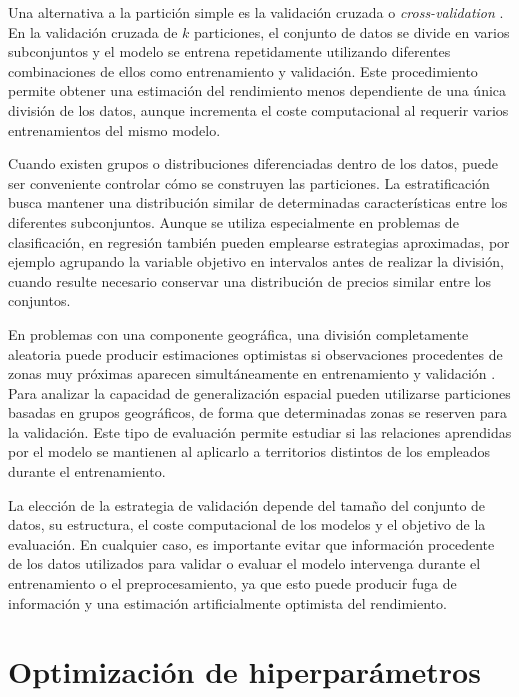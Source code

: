\documentclass[IB]{TFUOC}%
\begin{document}
Una alternativa a la partición simple es la validación cruzada o \textit{cross-validation} \cite{arlot2010crossvalidation}. En la validación cruzada de $k$ particiones, el conjunto de datos se divide en varios subconjuntos y el modelo se entrena repetidamente utilizando diferentes combinaciones de ellos como entrenamiento y validación. Este procedimiento permite obtener una estimación del rendimiento menos dependiente de una única división de los datos, aunque incrementa el coste computacional al requerir varios entrenamientos del mismo modelo.

Cuando existen grupos o distribuciones diferenciadas dentro de los datos, puede ser conveniente controlar cómo se construyen las particiones. La estratificación busca mantener una distribución similar de determinadas características entre los diferentes subconjuntos. Aunque se utiliza especialmente en problemas de clasificación, en regresión también pueden emplearse estrategias aproximadas, por ejemplo agrupando la variable objetivo en intervalos antes de realizar la división, cuando resulte necesario conservar una distribución de precios similar entre los conjuntos.

En problemas con una componente geográfica, una división completamente aleatoria puede producir estimaciones optimistas si observaciones procedentes de zonas muy próximas aparecen simultáneamente en entrenamiento y validación \cite{roberts2017crossvalidation}. Para analizar la capacidad de generalización espacial pueden utilizarse particiones basadas en grupos geográficos, de forma que determinadas zonas se reserven para la validación. Este tipo de evaluación permite estudiar si las relaciones aprendidas por el modelo se mantienen al aplicarlo a territorios distintos de los empleados durante el entrenamiento.

La elección de la estrategia de validación depende del tamaño del conjunto de datos, su estructura, el coste computacional de los modelos y el objetivo de la evaluación. En cualquier caso, es importante evitar que información procedente de los datos utilizados para validar o evaluar el modelo intervenga durante el entrenamiento o el preprocesamiento, ya que esto puede producir fuga de información y una estimación artificialmente optimista del rendimiento.

\section{Optimización de hiperparámetros}
\end{document}

